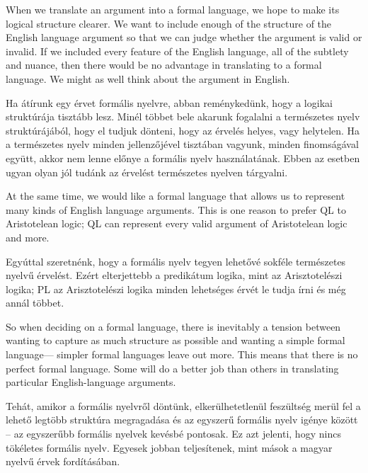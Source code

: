 When we translate an argument into a formal language, we hope to make its logical structure clearer. We want to include enough of the structure of the English language argument so that we can judge whether the argument is valid or invalid. If we included every feature of the English language, all of the subtlety and nuance, then there would be no advantage in translating to a formal language. We might as well think about the argument in English.

Ha átírunk egy érvet formális nyelvre, abban reménykedünk, hogy a logikai struktúrája tisztább lesz. Minél többet bele akarunk fogalalni a természetes nyelv struktúrájából, hogy el tudjuk dönteni, hogy az érvelés helyes, vagy helytelen. Ha a természetes nyelv minden jellenzőjével tisztában vagyunk, minden finomságával együtt, akkor nem lenne előnye a formális nyelv használatának. Ebben az esetben ugyan olyan jól tudánk az érvelést természetes nyelven tárgyalni.

At the same time, we would like a formal language that allows us to represent many kinds of English language arguments. This is one reason to prefer QL to Aristotelean logic; QL can represent every valid argument of Aristotelean logic and more.

 
Egyúttal szeretnénk, hogy a formális nyelv tegyen lehetővé sokféle természetes nyelvű érvelést. Ezért elterjettebb a predikátum logika, mint az Arisztotelészi logika; PL az Arisztotelészi logika minden lehetséges érvét le tudja írni és még annál többet.



So when deciding on a formal language, there is inevitably a tension between wanting to capture as much structure as possible and wanting a simple formal language--- simpler formal languages leave out more. This means that there is no perfect formal language. Some will do a better job than others in translating particular English-language arguments.

Tehát, amikor a formális nyelvről döntünk, elkerülhetetlenül feszültség merül fel a lehető legtöbb struktúra megragadása és az egyszerű formális nyelv igénye között -- az egyszerűbb formális nyelvek kevésbé pontosak. Ez azt jelenti, hogy nincs tökéletes formális nyelv. Egyesek jobban teljesítenek, mint mások a magyar nyelvű érvek fordításában.

